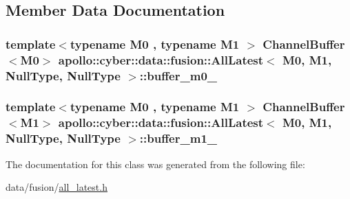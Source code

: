 \subsection{Member Data Documentation}
\hypertarget{classapollo_1_1cyber_1_1data_1_1fusion_1_1AllLatest_3_01M0_00_01M1_00_01NullType_00_01NullType_01_4_a36d8435a223930fc4b6c7ed1f2a4d2e7}{
\subsubsection[{buffer\-\_\-m0\-\_\-}]{\setlength{\rightskip}{0pt plus 5cm}template$<$typename M0 , typename M1 $>$ {\bf Channel\-Buffer}$<$M0$>$ {\bf apollo\-::cyber\-::data\-::fusion\-::\-All\-Latest}$<$ M0, M1, {\bf Null\-Type}, {\bf Null\-Type} $>$\-::buffer\-\_\-m0\-\_\-\hspace{0.3cm}{\ttfamily [private]}}}\label{classapollo_1_1cyber_1_1data_1_1fusion_1_1AllLatest_3_01M0_00_01M1_00_01NullType_00_01NullType_01_4_a36d8435a223930fc4b6c7ed1f2a4d2e7}
\hypertarget{classapollo_1_1cyber_1_1data_1_1fusion_1_1AllLatest_3_01M0_00_01M1_00_01NullType_00_01NullType_01_4_a5fded1f4f01a2e0fd1888f0a45053bfc}{
\subsubsection[{buffer\-\_\-m1\-\_\-}]{\setlength{\rightskip}{0pt plus 5cm}template$<$typename M0 , typename M1 $>$ {\bf Channel\-Buffer}$<$M1$>$ {\bf apollo\-::cyber\-::data\-::fusion\-::\-All\-Latest}$<$ M0, M1, {\bf Null\-Type}, {\bf Null\-Type} $>$\-::buffer\-\_\-m1\-\_\-\hspace{0.3cm}{\ttfamily [private]}}}\label{classapollo_1_1cyber_1_1data_1_1fusion_1_1AllLatest_3_01M0_00_01M1_00_01NullType_00_01NullType_01_4_a5fded1f4f01a2e0fd1888f0a45053bfc}


The documentation for this class was generated from the following file\-:\begin{DoxyCompactItemize}
\item 
data/fusion/\hyperlink{all__latest_8h}{all\-\_\-latest.\-h}\end{DoxyCompactItemize}
